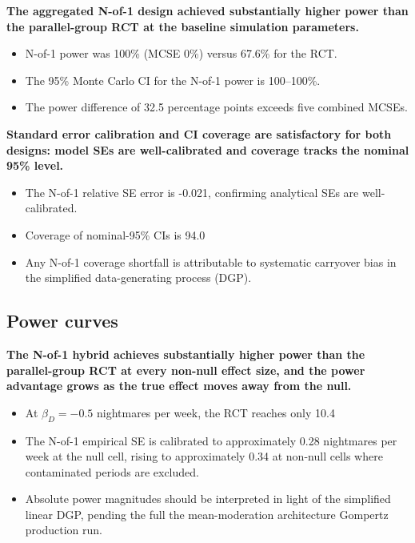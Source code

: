 \documentclass[
  11pt,
]{article}
\begin{document}
\textbf{The aggregated N-of-1 design achieved substantially higher power than the parallel-group RCT at the baseline simulation parameters.}

\begin{itemize}\setlength{\itemsep}{2pt}\setlength{\parskip}{0pt}
\item N-of-1 power was 100\% (MCSE 0\%) versus 67.6\% for the RCT.
\item The 95\% Monte Carlo CI for the N-of-1 power is 100--100\%.
\item The power difference of 32.5 percentage points exceeds five combined MCSEs.
\end{itemize}

\textbf{Standard error calibration and CI coverage are satisfactory for both designs: model SEs are well-calibrated and coverage tracks the nominal 95\% level.}

\begin{itemize}\setlength{\itemsep}{2pt}\setlength{\parskip}{0pt}
\item The N-of-1 relative SE error is -0.021, confirming analytical SEs are well-calibrated.
\item Coverage of nominal-95\% CIs is 94.0%
\item Any N-of-1 coverage shortfall is attributable to systematic carryover bias in the simplified data-generating process (DGP).
\end{itemize}

\subsection{Power curves}\label{sec:power}

\textbf{The N-of-1 hybrid achieves substantially higher power than the parallel-group RCT at every non-null effect size, and the power advantage grows as the true effect moves away from the null.}

\begin{itemize}\setlength{\itemsep}{2pt}\setlength{\parskip}{0pt}
\item At $\beta_D = -0.5$ nightmares per week, the RCT reaches only 10.4%
\item The N-of-1 empirical SE is calibrated to approximately 0.28 nightmares per week at the null cell, rising to approximately 0.34 at non-null cells where contaminated periods are excluded.
\item Absolute power magnitudes should be interpreted in light of the simplified linear DGP, pending the full the mean-moderation architecture Gompertz production run.
\end{itemize}
\end{document}
